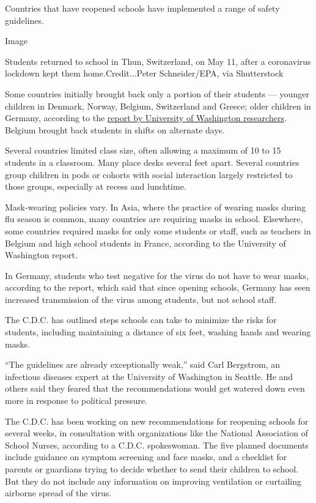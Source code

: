 Countries that have reopened schools have implemented a range of safety
guidelines.

Image

Students returned to school in Thun, Switzerland, on May 11, after a
coronavirus lockdown kept them home.Credit...Peter Schneider/EPA, via
Shutterstock

Some countries initially brought back only a portion of their students
--- younger children in Denmark, Norway, Belgium, Switzerland and
Greece; older children in Germany, according to the
\href{https://globalhealth.washington.edu/sites/default/files/COVID-19\%20Schools\%20Summary\%20\%282\%29.pdf?mkt_tok=eyJpIjoiTkRreE5XWXlORFF3TXpNeCIsInQiOiJIbVNQTTVySEo0Vzk1cHVBZVVqWnFGVmR1UEJxRGdpd01mTXg4OGw3Mk5nTnpmaUoyMGt2UXIwWVZBOE5GVjIybHA5aStrbzJ3MUxsanoxamZibmlocmpSbXZyVFVoV0VHYU1aTGx0RnpsMXlmOEtXSVJqaDJsZ0RJU1BQcVZjZSJ9}{report
by University of Washington researchers}. Belgium brought back students
in shifts on alternate days.

Several countries limited class size, often allowing a maximum of 10 to
15 students in a classroom. Many place desks several feet apart. Several
countries group children in pods or cohorts with social interaction
largely restricted to those groups, especially at recess and lunchtime.

Mask-wearing policies vary. In Asia, where the practice of wearing masks
during flu season is common, many countries are requiring masks in
school. Elsewhere, some countries required masks for only some students
or staff, such as teachers in Belgium and high school students in
France, according to the University of Washington report.

In Germany, students who test negative for the virus do not have to wear
masks, according to the report, which said that since opening schools,
Germany has seen increased transmission of the virus among students, but
not school staff.

The C.D.C. has outlined steps schools can take to minimize the risks for
students, including maintaining a distance of six feet, washing hands
and wearing masks.

``The guidelines are already exceptionally weak,'' said Carl Bergstrom,
an infectious diseases expert at the University of Washington in
Seattle. He and others said they feared that the recommendations would
get watered down even more in response to political pressure.

The C.D.C. has been working on new recommendations for reopening schools
for several weeks, in consultation with organizations like the National
Association of School Nurses, according to a C.D.C. spokeswoman. The
five planned documents include guidance on symptom screening and face
masks, and a checklist for parents or guardians trying to decide whether
to send their children to school. But they do not include any
information on improving ventilation or curtailing airborne spread of
the virus.

